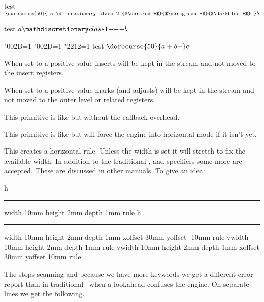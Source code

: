 \startbuffer
test $ \dorecurse {50} {
    a \discretionary class 2 {$\darkred +$}{$\darkgreen +$}{$\darkblue +$}
} b$

test $ a \mathdiscretionary class 1 {-}{-}{-} b$

\bgroup
    \hmcode"002B=1 %
    \hmcode"002D=1 %
    \hmcode"2212=1 %
    test $ \dorecurse{50}{a + b - } c$
\egroup
\stopbuffer

\typebuffer

{\getbuffer}

\stopnewprimitive

\startoldprimitive[title={\prm {holdinginserts}}]

When set to a positive value inserts will be kept in the stream and not moved to
the insert registers.

\stopoldprimitive

\startnewprimitive[title={\prm {holdingmigrations}}]

When set to a positive value marks (and adjusts) will be kept in the stream and
not moved to the outer level or related registers.

\stopnewprimitive

\startnewprimitive[title={\prm {hpack}}]

This primitive is like  but without the callback overhead.

\stopnewprimitive

\startnewprimitive[title={\prm {hpenalty}}]

This primitive is like  but will force the engine into horizontal
mode if it isn't yet.

\stopnewprimitive

\startoldprimitive[title={\prm {hrule}}]

This creates a horizontal rule. Unless the width is set it will stretch to fix
the available width. In addition to the traditional , 
and  specifiers some more are accepted. These are discussed in other
manuals. To give an idea:

\startbuffer
h\hrule width 10mm height 2mm depth 1mm \relax rule
h\hrule width 10mm height 2mm depth 1mm xoffset 30mm yoffset -10mm \relax rule
v\vrule width 10mm height 2mm depth 1mm \relax rule
v\vrule width 10mm height 2mm depth 1mm xoffset 30mm yoffset  10mm \relax rule
\stopbuffer

\typebuffer

The  stops scanning and because we have more keywords we get a
different error report than in traditional \TEX\ when a lookahead confuses the
engine. On separate lines we get the following.

